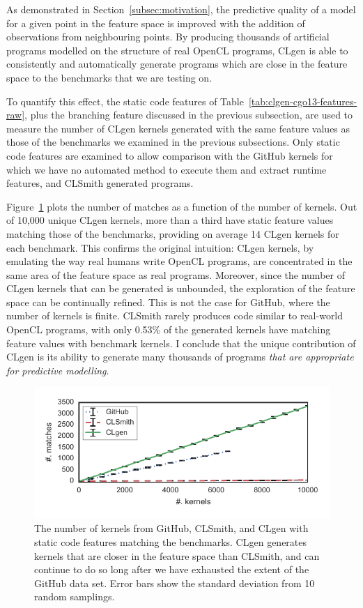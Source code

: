 As demonstrated in Section~\ref{subsec:motivation}, the predictive quality of a model for a given point in the feature space is improved with the addition of observations from neighbouring points. By producing thousands of artificial programs modelled on the structure of real OpenCL programs, CLgen is able to consistently and automatically generate programs which are close in the feature space to the benchmarks that we are testing on.

To quantify this effect, the static code features of Table~\ref{tab:clgen-cgo13-features-raw}, plus the branching feature discussed in the previous subsection, are used to measure the number of CLgen kernels generated with the same feature values as those of the benchmarks we examined in the previous subsections. Only static code features are examined to allow comparison with the GitHub kernels for which we have no automated method to execute them and extract runtime features, and CLSmith generated programs.

Figure~\ref{fig:clgen-nearest-neighbour} plots the number of matches as a function of the number of kernels. Out of 10,000 unique CLgen kernels, more than a third have static feature values matching those of the benchmarks, providing on average 14 CLgen kernels for each benchmark. This confirms the original intuition: CLgen kernels, by emulating the way real humans write OpenCL programs, are concentrated in the same area of the feature space as real programs. Moreover, since the number of CLgen kernels that can be generated is unbounded, the exploration of the feature space can be continually refined. This is not the case for GitHub, where the number of kernels is finite. CLSmith rarely produces code similar to real-world OpenCL programs, with only 0.53\% of the generated kernels have matching feature values with benchmark kernels. I conclude that the unique contribution of CLgen is its ability to generate many thousands of programs \textit{that are appropriate for predictive modelling}.

\begin{figure}
  \includegraphics[width=\columnwidth]{img/closeness} %
  \caption[Number of kernels matching benchmark features]{%
    The number of kernels from GitHub, CLSmith, and CLgen with static code features matching the benchmarks. CLgen generates kernels that are closer in the feature space than CLSmith, and can continue to do so long after we have exhausted the extent of the GitHub data set. Error bars show the standard deviation from 10 random samplings.%
  }%
  \label{fig:clgen-nearest-neighbour}
\end{figure}
